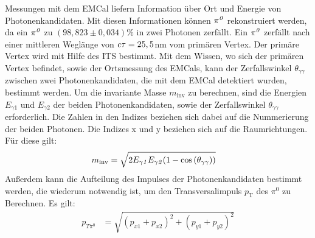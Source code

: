 Messungen mit dem EMCal liefern Information {\"u}ber Ort und Energie von Photonenkandidaten.
Mit diesen Informationen k{\"o}nnen ${\it \pi^{0}}$ rekonstruiert werden, da ein ${\it \pi^{0}}$ zu $\left( 98,823\pm0,034\right)\%$ \cite{webpage:pdg} in zwei Photonen zerf{\"a}llt.
Ein ${\it \pi^{0}}$ zerf{\"a}llt nach einer mittleren Wegl{\"a}nge von ${\it c\tau} = 25,5$nm vom prim{\"a}ren Vertex.
Der prim{\"a}re Vertex wird mit Hilfe des ITS bestimmt.
\newline
Mit dem Wissen, wo sich der prim{\"a}ren Vertex befindet, sowie der Ortsmessung des EMCals, kann der Zerfallswinkel $\theta_{\gamma\gamma}$ zwischen zwei Photonenkandidaten, die mit dem EMCal detektiert wurden, bestimmt werden.
\newline 
Um die invariante Masse $m_{\text{inv}}$ zu berechnen, sind die Energien $E_{\gamma1}$ und $E_{\gamma2}$ der beiden Photonenkandidaten, sowie der Zerfallswinkel $\theta_{\gamma\gamma}$ erforderlich.
\newline
Die Zahlen in den Indizes beziehen sich dabei auf die Nummerierung der beiden Photonen. Die Indizes x und y beziehen sich auf die Raumrichtungen. F{\"u}r diese gilt:
\begin{align}
m_{\text{inv}} &= \sqrt{2E_{\gamma\it{1}}E_{\gamma\it{2}}(1-\cos\left( \theta_{\gamma\gamma}\right) )} \label{eq_invmass}
\end{align}
Au{\ss}erdem kann die Aufteilung des Impulses der Photonenkandidaten bestimmt werden, die wiederum notwendig ist, um den Transversalimpuls $p_\text{T}$ des $\pi^{0}$ zu Berechnen. Es gilt:
\begin{align}
p_{T\pi^{0}} &= \sqrt{\left(p_{x1}+p_{x2}\right)^{2} +\left(p_{y1}+p_{y2}\right)^{2}} \label{eq_pt}
\end{align}
